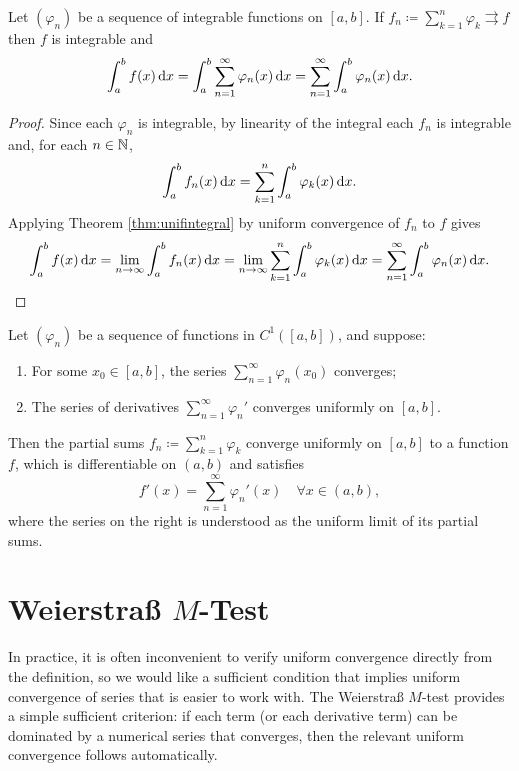 \documentclass[../analysis1.tex]{subfiles}
\begin{document}
\begin{corollary}
\label{cor:swapsumintegral}
    \begin{shaded*}
        Let $(\varphi_n)$ be a sequence of integrable functions on $[a,b]$. If $f_n\coloneqq \sum_{k=1}^n \varphi_k \rightrightarrows f$ then $f$ is integrable and \[\int_a^b f(x)\d{x} = \int_a^b \sum_{n=1}^{\infty}\varphi_n(x)\d{x}=\sum_{n=1}^{\infty}\int_a^b \varphi_n(x)\d{x}.\]
    \end{shaded*}
\end{corollary}
\begin{proof}
    Since each $\varphi_n$ is integrable, by linearity of the integral each $f_n$ is integrable and, for each $n\in\mathbb{N}$,
    \[\int_a^b f_n(x)\d{x} = \sum_{k=1}^n \int_a^b \varphi_k(x)\d{x}.\]
    Applying Theorem \ref{thm:unifintegral} by uniform convergence of $f_n$ to $f$ gives
    \[\int_a^b f(x)\d{x}=\lim_{n\to\infty}\int_a^b f_n(x)\d{x}=\lim_{n\to\infty} \sum_{k=1}^n \int_a^b \varphi_k(x)\d{x}=\sum_{n=1}^{\infty}\int_a^b \varphi_n(x)\d{x}.\]
\end{proof}

\begin{corollary}
\label{cor:swapsumderivative}
    \begin{shaded*}
        Let $(\varphi_n)$ be a sequence of functions in $C^1([a,b])$, and suppose:
        \begin{enumerate}
            \item For some $x_0\in [a,b]$, the series $\sum_{n=1}^{\infty}\varphi_n(x_0)$ converges;
            \item The series of derivatives $\sum_{n=1}^{\infty}\varphi_n'$ converges uniformly on $[a,b]$. 
        \end{enumerate}
        Then the partial sums $f_n\coloneqq \sum_{k=1}^n \varphi_k$ converge uniformly on $[a,b]$ to a function $f$, which is differentiable on $(a,b)$ and satisfies
        \[f'(x)=\sum_{n=1}^{\infty}\varphi_n'(x)\quad\forall x\in(a,b),\]
        where the series on the right is understood as the uniform limit of its partial sums.
    \end{shaded*}
\end{corollary}

\section{Weierstraß \texorpdfstring{$M$}{M}-Test}

In practice, it is often inconvenient to verify uniform convergence directly from the definition, so we would like a sufficient condition that implies uniform convergence of series that is easier to work with. 
The Weierstraß $M$-test provides a simple sufficient criterion: if each term (or each derivative term) can be dominated by a numerical series that converges, then the relevant uniform convergence follows automatically.
\end{document}
